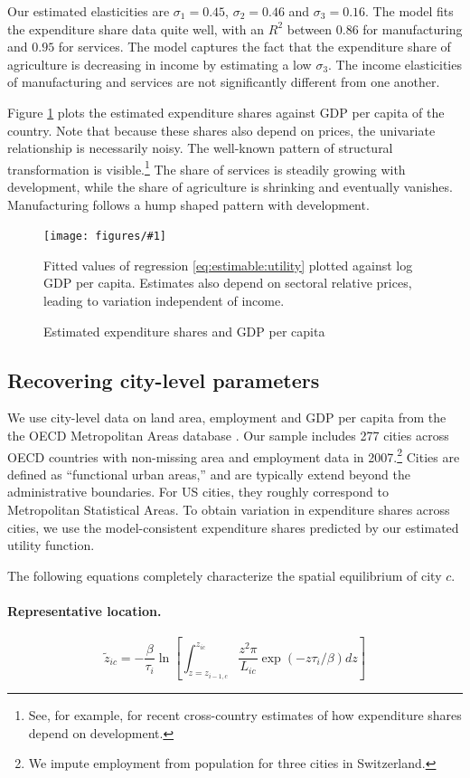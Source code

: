 \documentclass[12pt]{article}
\newcommand{\dofigure}[3]{\begin{figure}
\begin{centering}
\texttt{[image: figures/\#1]}
  \caption{#2\label{fig:#1}}
\end{centering}

\noindent \footnotesize{#3}
\end{figure}}
\begin{document}
Our estimated elasticities are $\sigma_1=0.45$, $\sigma_2=0.46$ and $\sigma_3=0.16$. The model fits the expenditure share data quite well, with an $R^2$ between $0.86$ for manufacturing and $0.95$ for services. The model captures the fact that the expenditure share of agriculture is decreasing in income by estimating a low $\sigma_3$. The income elasticities of manufacturing and services are not significantly different from one another. 

Figure \ref{fig:city_level_inputs/expenditure_shares} plots the estimated expenditure shares against GDP per capita of the country. Note that because these shares also depend on prices, the univariate relationship is necessarily noisy. The well-known pattern of structural transformation is visible.\footnote{See, for example,  for recent cross-country estimates of how expenditure shares depend on development.} The share of services is steadily growing with development, while the share of agriculture is shrinking and eventually vanishes. Manufacturing follows a hump shaped pattern with development.

\dofigure{city_level_inputs/expenditure_shares}{Estimated expenditure shares and GDP per capita}{Fitted values of regression \eqref{eq:estimable:utility} plotted against log GDP per capita. Estimates also depend on sectoral relative prices, leading to variation independent of income.}

\subsection{Recovering city-level parameters}
We use city-level data on land area, employment and GDP per capita from the the OECD Metropolitan Areas database \cite{oecd}. Our sample includes 277 cities across OECD countries with non-missing area and employment data in 2007.\footnote{We impute employment from population for three cities in Switzerland.} Cities are defined as ``functional urban areas,'' and are typically extend beyond the administrative boundaries. For US cities, they roughly correspond to Metropolitan Statistical Areas. To obtain variation in expenditure shares across cities, we use the model-consistent expenditure shares predicted by our estimated utility function. 

The following equations completely characterize the spatial equilibrium of city $c$.

\paragraph{Representative location.}
\begin{equation}\label{eq:representative_location}
	\tilde z_{ic}
	=
	- \frac {\beta}{\tau_i}
	\ln
	\left[
	\int_{z=z_{i-1,c}}^{z_{ic}}
		\frac {z^2\pi}{L_{ic}}
		\exp(-z \tau_i/\beta)
		dz
	\right]
\end{equation}
\end{document}
